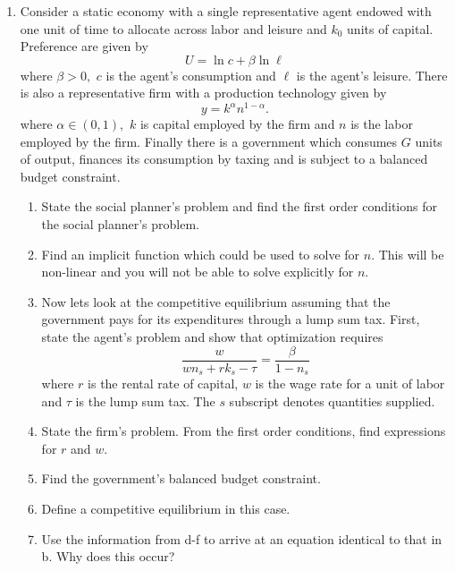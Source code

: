 \documentclass{article}
\begin{document}
\begin{enumerate}
\item Consider a static economy with a single representative agent endowed
with one unit of time to allocate across labor and leisure and $k_{0}$ units
of capital. Preference are given by 
\begin{equation}
U=\ln c+\beta \ln \ell  \label{utility}
\end{equation}%
where $\beta >0,$ $c$ is the agent's consumption and $\ell $ is the agent's
leisure$.$ There is also a representative firm with a production technology
given by 
\begin{equation*}
y=k^{\alpha }n^{1-\alpha }.
\end{equation*}%
where $\alpha \in \left( 0,1\right) ,$ $k$ is capital employed by the firm
and $n$ is the labor employed by the firm$.$ Finally there is a government
which consumes $G$ units of output, finances its consumption by taxing and
is subject to a balanced budget constraint.

\begin{enumerate}
\item State the social planner's problem and find the first order conditions
for the social planner's problem.

\item Find an implicit function which could be used to solve for $n.$ This
will be non-linear and you will not be able to solve explicitly for $n.$

\item Now lets look at the competitive equilibrium assuming that the
government pays for its expenditures through a lump sum tax. First, state
the agent's problem and show that optimization requires 
\begin{equation*}
\frac{w}{wn_{s}+rk_{s}-\tau }=\frac{\beta }{1-n_{s}}
\end{equation*}%
where $r$ is the rental rate of capital, $w$ is the wage rate for a unit of
labor and $\tau $ is the lump sum tax. The $s$ subscript denotes quantities
supplied.

\item State the firm's problem. From the first order conditions, find
expressions for $r$ and $w$.

\item Find the government's balanced budget constraint.

\item Define a competitive equilibrium in this case.

\item Use the information from d-f to arrive at an equation identical to
that in b. Why does this occur?


\end{enumerate}
\end{enumerate}
\end{document}
